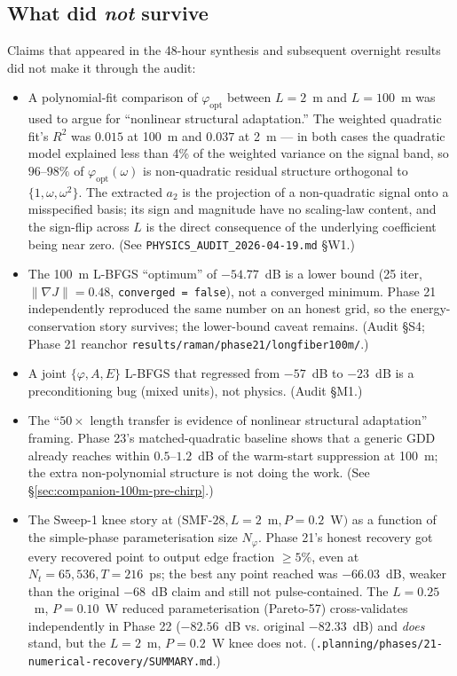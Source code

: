 \documentclass[12pt,a4paper]{article}
\begin{document}
\subsection{What did \emph{not} survive}

Claims that appeared in the 48-hour synthesis and subsequent
overnight results did not make it through the audit:
\begin{itemize}
  \item A polynomial-fit comparison of $\varphi_{\text{opt}}$ between
    $L = 2$~m and $L = 100$~m was used to argue for ``nonlinear
    structural adaptation.'' The weighted quadratic fit's $R^2$ was
    $0.015$ at 100~m and $0.037$ at 2~m --- in both cases the
    quadratic model explained less than 4\% of the weighted
    variance on the signal band, so $96$--$98\%$ of
    $\varphi_{\text{opt}}(\omega)$ is non-quadratic residual
    structure orthogonal to $\{1, \omega, \omega^2\}$. The extracted
    $a_2$ is the projection of a non-quadratic signal onto a
    misspecified basis; its sign and magnitude have no scaling-law
    content, and the sign-flip across $L$ is the direct consequence
    of the underlying coefficient being near zero.
    (See \texttt{PHYSICS\_AUDIT\_2026-04-19.md} §W1.)
  \item The 100~m L-BFGS ``optimum'' of $-54.77$~dB is a lower bound
    (25 iter, $\|\nabla J\| = 0.48$, \texttt{converged = false}),
    not a converged minimum. Phase 21 independently reproduced the
    same number on an honest grid, so the energy-conservation
    story survives; the lower-bound caveat remains. (Audit §S4;
    Phase 21 reanchor \texttt{results/raman/phase21/longfiber100m/}.)
  \item A joint $\{\varphi, A, E\}$ L-BFGS that regressed from
    $-57$~dB to $-23$~dB is a preconditioning bug (mixed units), not
    physics. (Audit §M1.)
  \item The ``$50\times$ length transfer is evidence of nonlinear
    structural adaptation'' framing. Phase 23's matched-quadratic
    baseline shows that a generic GDD already reaches within
    $0.5$--$1.2$~dB of the warm-start suppression at 100~m; the
    extra non-polynomial structure is not doing the work.
    (See §\ref{sec:companion-100m-pre-chirp}.)
  \item The Sweep-1 knee story at $(\text{SMF-28}, L=2$~m$, P=0.2$~W$)$
    as a function of the simple-phase parameterisation size
    $N_\varphi$. Phase 21's honest recovery got every recovered
    point to output edge fraction $\geq 5\%$, even at
    $N_t{=}65{,}536, T{=}216$~ps; the best any point reached was
    $-66.03$~dB, weaker than the original $-68$~dB claim and still
    not pulse-contained. The $L=0.25$~m, $P=0.10$~W reduced
    parameterisation (Pareto-57) cross-validates independently in
    Phase 22 ($-82.56$~dB vs. original $-82.33$~dB) and \emph{does}
    stand, but the $L=2$~m, $P=0.2$~W knee does not.
    (\texttt{.planning/phases/21-numerical-recovery/SUMMARY.md}.)
\end{itemize}
\end{document}
